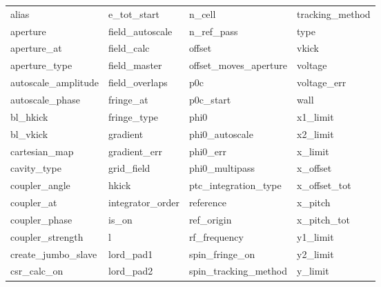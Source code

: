  \begin{tabular}{llll} \toprule
alias                       & e_tot_start                 & n_cell                      & tracking_method             \\
aperture                    & field_autoscale             & n_ref_pass                  & type                        \\
aperture_at                 & field_calc                  & offset                      & vkick                       \\
aperture_type               & field_master                & offset_moves_aperture       & voltage                     \\
autoscale_amplitude         & field_overlaps              & p0c                         & voltage_err                 \\
autoscale_phase             & fringe_at                   & p0c_start                   & wall                        \\
bl_hkick                    & fringe_type                 & phi0                        & x1_limit                    \\
bl_vkick                    & gradient                    & phi0_autoscale              & x2_limit                    \\
cartesian_map               & gradient_err                & phi0_err                    & x_limit                     \\
cavity_type                 & grid_field                  & phi0_multipass              & x_offset                    \\
coupler_angle               & hkick                       & ptc_integration_type        & x_offset_tot                \\
coupler_at                  & integrator_order            & reference                   & x_pitch                     \\
coupler_phase               & is_on                       & ref_origin                  & x_pitch_tot                 \\
coupler_strength            & l                           & rf_frequency                & y1_limit                    \\
create_jumbo_slave          & lord_pad1                   & spin_fringe_on              & y2_limit                    \\
csr_calc_on                 & lord_pad2                   & spin_tracking_method        & y_limit                     \\

\end{tabular}
